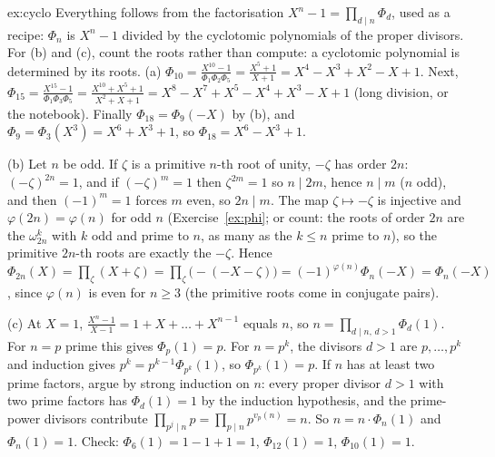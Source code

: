 \begin{solution}{ex:cyclo}
\idea Everything follows from the factorisation $X^n-1=\prod_{d\mid n}\Phi_d$, used as a recipe: $\Phi_n$ is $X^n-1$ divided by the cyclotomic polynomials of the proper divisors. For (b) and (c), count the roots rather than compute: a cyclotomic polynomial is determined by its roots.
\writeup (a) $\Phi_{10}=\frac{X^{10}-1}{\Phi_1\Phi_2\Phi_5}=\frac{X^5+1}{X+1}=X^4-X^3+X^2-X+1$. Next, $\Phi_{15}=\frac{X^{15}-1}{\Phi_1\Phi_3\Phi_5}=\frac{X^{10}+X^5+1}{X^2+X+1}=X^8-X^7+X^5-X^4+X^3-X+1$ (long division, or the notebook). Finally $\Phi_{18}=\Phi_9(-X)$ by (b), and $\Phi_9=\Phi_3(X^3)=X^6+X^3+1$, so $\Phi_{18}=X^6-X^3+1$.

(b) Let $n$ be odd. If $\zeta$ is a primitive $n$-th root of unity, $-\zeta$ has order $2n$: $(-\zeta)^{2n}=1$, and if $(-\zeta)^m=1$ then $\zeta^{2m}=1$ so $n\mid2m$, hence $n\mid m$ ($n$ odd), and then $(-1)^m=1$ forces $m$ even, so $2n\mid m$. The map $\zeta\mapsto-\zeta$ is injective and $\varphi(2n)=\varphi(n)$ for odd $n$ (Exercise~\ref{ex:phi}; or count: the roots of order $2n$ are the $\omega_{2n}^k$ with $k$ odd and prime to $n$, as many as the $k\le n$ prime to $n$), so the primitive $2n$-th roots are exactly the $-\zeta$. Hence $\Phi_{2n}(X)=\prod_\zeta(X+\zeta)=\prod_\zeta\bigl(-(-X-\zeta)\bigr)=(-1)^{\varphi(n)}\Phi_n(-X)=\Phi_n(-X)$, since $\varphi(n)$ is even for $n\ge3$ (the primitive roots come in conjugate pairs).

(c) At $X=1$, $\frac{X^n-1}{X-1}=1+X+\dots+X^{n-1}$ equals $n$, so $n=\prod_{d\mid n,\,d>1}\Phi_d(1)$. For $n=p$ prime this gives $\Phi_p(1)=p$. For $n=p^k$, the divisors $d>1$ are $p,\dots,p^k$ and induction gives $p^k=p^{k-1}\Phi_{p^k}(1)$, so $\Phi_{p^k}(1)=p$. If $n$ has at least two prime factors, argue by strong induction on $n$: every proper divisor $d>1$ with two prime factors has $\Phi_d(1)=1$ by the induction hypothesis, and the prime-power divisors contribute $\prod_{p^j\mid n}p=\prod_{p\mid n}p^{v_p(n)}=n$. So $n=n\cdot\Phi_n(1)$ and $\Phi_n(1)=1$. Check: $\Phi_6(1)=1-1+1=1$, $\Phi_{12}(1)=1$, $\Phi_{10}(1)=1$.
\end{solution}

